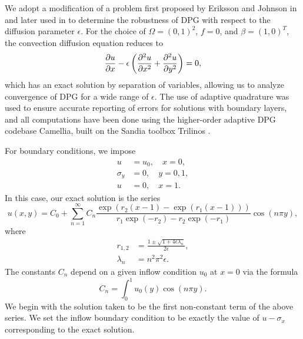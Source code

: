We adopt a modification of a problem first proposed by Eriksson and Johnson in \cite{Eriksson1993} and later used in \cite{DPGrobustness} to determine the robustness of DPG with respect to the diffusion parameter $\epsilon$. For the choice of $\Omega = (0,1)^2$, $f=0$, and $\beta = (1,0)^T$, the convection diffusion equation reduces to
\[
\pd{u}{x} - \epsilon \left(\pdd{u}{x}+ \pdd{u}{y}\right) = 0,
\]
which has an exact solution by separation of variables, allowing us to analyze convergence of DPG for a wide range of $\epsilon$. The use of adaptive quadrature was used to ensure accurate reporting of errors for solutions with boundary layers, and all computations have been done using the higher-order adaptive DPG codebase Camellia, built on the Sandia toolbox Trilinos \cite{Camellia}.

For boundary conditions, we impose
\begin{align*}
u &= u_0, \quad x=0,\\
\sigma_y &=  0, \quad y=0,1,\\
u &= 0, \quad x=1.
\end{align*}
In this case, our exact solution is the series
\[
u(x,y) = C_0 + \sum_{n=1}^\infty C_n \frac{\exp(r_2(x-1)-\exp(r_1(x-1)))}{r_1\exp(-r_2) - r_2\exp(-r_1)}\cos(n\pi y),
\]
where
\begin{align*}
r_{1,2} &= \frac{1 \pm \sqrt{1 + 4 \epsilon\lambda_n}}{2 \epsilon},\\
\lambda_n &= n^2\pi^2 \epsilon.
\end{align*}
The constants $C_n$ depend on a given inflow condition $u_0$ at $x=0$ via the formula
\[
C_n = \int_0^1 u_0(y) \cos(n\pi y).
\]
We begin with the solution taken to be the first non-constant term of the above series.  We set the inflow boundary condition to be exactly the value of $u-\sigma_x$ corresponding to the exact solution.  

